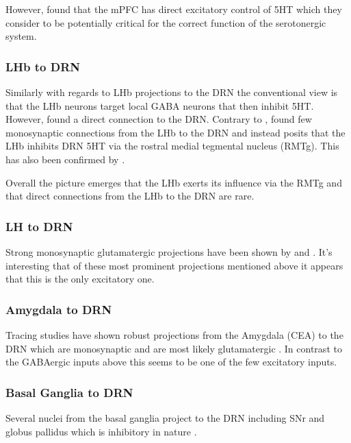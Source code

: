 \documentclass[12pt,a4paper]{article}
\begin{document}
However, \citep{PollakDorocic2014} found that the mPFC has direct excitatory control of 5HT which they consider to be potentially critical for the correct function of the serotonergic system. 

\subsubsection{LHb to DRN}

Similarly with regards to LHb projections to the DRN the conventional view is that the LHb neurons
target local GABA neurons that then inhibit 5HT. However, \citep{PollakDorocic2014} found a direct connection to the DRN. Contrary to \citep{PollakDorocic2014}, \citep{Ogawa2014} found few monosynaptic connections from the LHb to the DRN and instead posits that the LHb inhibits DRN 5HT via the rostral medial tegmental nucleus (RMTg). This has also been confirmed by \citep{Sego2014}.

Overall the picture emerges that the LHb exerts its influence via the RMTg and that direct connections from the LHb to the DRN are rare.

\subsubsection{LH to DRN}

Strong monosynaptic glutamatergic projections have been shown by \citep{Lee2003} and \citep{Aghajanian1990}. It's interesting that of these most prominent projections mentioned above it appears that this is the only excitatory one.

\subsubsection{Amygdala to DRN}

Tracing studies have shown robust projections from the Amygdala (CEA) to the DRN \citep{PollakDorocic2014} which are monosynaptic and are most likely glutamatergic \citep{Swanson1998}. In contrast to the GABAergic inputs above this seems to be one of the few excitatory inputs.

\subsubsection{Basal Ganglia to DRN}

Several nuclei from the basal ganglia project to the DRN including SNr and globus pallidus which is inhibitory in nature \citep{PollakDorocic2014}.
\end{document}
